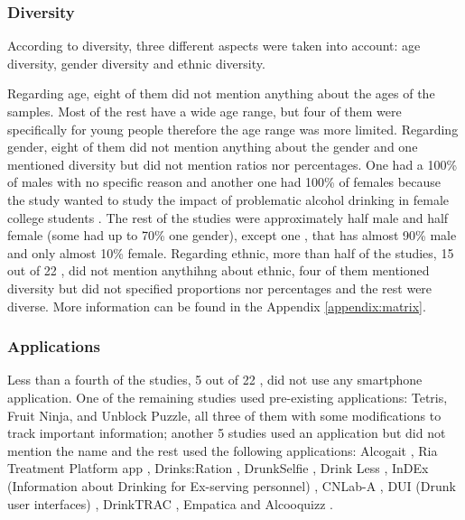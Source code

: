 \subsubsection{Diversity}

According to diversity, three different aspects were taken into account: age diversity, gender diversity and ethnic diversity.

Regarding age, eight of them \cite{Businelle2020,Wakana2019,Sempionatto2019161,Willoughby2019496,Garnett2019296,Chatterjee2018,Mellentin2017,Park201774} did not mention anything about the ages of the samples. Most of the rest have a wide age range, but four of them \cite{Phan2020211,Killian201935,Suffoletto2018116,Leonard2017} were specifically for young people therefore the age range was more limited.
Regarding gender, eight of them \cite{Businelle2020,Leightley2020,Wakana2019,Sempionatto2019161,Garnett2019296,Chatterjee2018,Mellentin2017,Park201774} did not mention anything about the gender and one mentioned diversity but did not mention ratios nor percentages. One had a 100\% of males with no specific reason \cite{Intarasirisawat2020} and another one had 100\% of females because the study wanted to study the impact of problematic alcohol drinking in female college students \cite{Leonard2017}. The rest of the studies were approximately half male and half female (some had up to 70\% one gender), except one \cite{Leightley2018}, that has almost 90\% male and only almost 10\% female.
Regarding ethnic, more than half of the studies, 15 out of 22 \cite{Li2021,Intarasirisawat2020,Phan2020211,Mitchell2020297,Leightley2020,Wakana2019,Sempionatto2019161,Willoughby2019496,Garnett2019296,Chatterjee2018,Leightley2018,Poulton201835}, did not mention anythihng about ethnic, four of them \cite{Businelle2020,Suffoletto2020505,Mariakakis2018,Bertholet2017285} mentioned diversity but did not specified proportions nor percentages and the rest were diverse. More information can be found in the Appendix \ref{appendix:matrix}.

\subsubsection{Applications}

Less than a fourth of the studies, 5 out of 22 \cite{Suffoletto2020505,Sempionatto2019161,Chatterjee2018,Kinnamon2017,Park201774}, did not use any smartphone application. One of the remaining studies \cite{Intarasirisawat2020} used pre-existing applications: Tetris, Fruit Ninja, and Unblock Puzzle, all three of them with some modifications to track important information; another 5 studies \cite{Phan2020211,Businelle2020,Wakana2019,Killian201935,Mellentin2017} used an application but did not mention the name and the rest used the following applications: Alcogait \cite{Li2021}, Ria Treatment Platform app \cite{Mitchell2020297}, Drinks:Ration \cite{Leightley2020}, DrunkSelfie \cite{Willoughby2019496}, Drink Less \cite{Garnett2019296}, InDEx (Information about Drinking for Ex-serving personnel) \cite{Leightley2018}, CNLab-A \cite{Poulton201835}, DUI (Drunk user interfaces) \cite{Mariakakis2018}, DrinkTRAC \cite{Suffoletto2018116}, Empatica \cite{Leonard2017} and Alcooquizz \cite{Bertholet2017285}.

